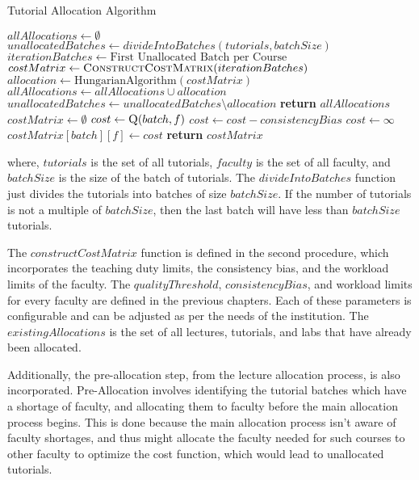 \begin{algorithm}[H]
  \caption{Tutorial Allocation Algorithm}
  \begin{algorithmic}
    \State $allAllocations \gets \emptyset$
    \State $unallocatedBatches \gets divideIntoBatches(tutorials, batchSize)$
    \State $iterationBatches \gets \text{First Unallocated Batch per Course}$
    \State $costMatrix \gets \Call{ConstructCostMatrix}{iterationBatches}$
    \State $allocation \gets \text{HungarianAlgorithm}(costMatrix)$
    \State $allAllocations \gets allAllocations \cup allocation$
    \State $unallocatedBatches \gets unallocatedBatches \setminus allocation$
    \EndWhile
    \State \textbf{return} $allAllocations$
    \EndProcedure
    \\
    \State $costMatrix \gets \emptyset$
    \State $cost \gets \Call{Q}{batch, f}$
    \State $cost \gets cost - consistencyBias$
    \EndIf
    \State $cost \gets \infty$
    \EndIf
    \State $costMatrix[batch][f] \gets cost$
    \EndFor
    \EndFor
    \State \textbf{return} $costMatrix$
    \EndProcedure
  \end{algorithmic}
  \label{alg:tutorial_allocation}
\end{algorithm}

where, $tutorials$ is the set of all tutorials, $faculty$ is the set of all faculty, and $batchSize$ is the size of the batch of tutorials. The $divideIntoBatches$ function just divides the tutorials into batches of size $batchSize$. If the number of tutorials is not a multiple of $batchSize$, then the last batch will have less than $batchSize$ tutorials.

The $constructCostMatrix$ function is defined in the second procedure, which incorporates the teaching duty limits, the consistency bias, and the workload limits of the faculty. The $qualityThreshold$, $consistencyBias$, and workload limits for every faculty are defined in the previous chapters. Each of these parameters is configurable and can be adjusted as per the needs of the institution. The $existingAllocations$ is the set of all lectures, tutorials, and labs that have already been allocated.

Additionally, the pre-allocation step, from the lecture allocation process, is also incorporated. Pre-Allocation involves identifying the tutorial batches which have a shortage of faculty, and allocating them to faculty before the main allocation process begins. This is done because the main allocation process isn't aware of faculty shortages, and thus might allocate the faculty needed for such courses to other faculty to optimize the cost function, which would lead to unallocated tutorials.

